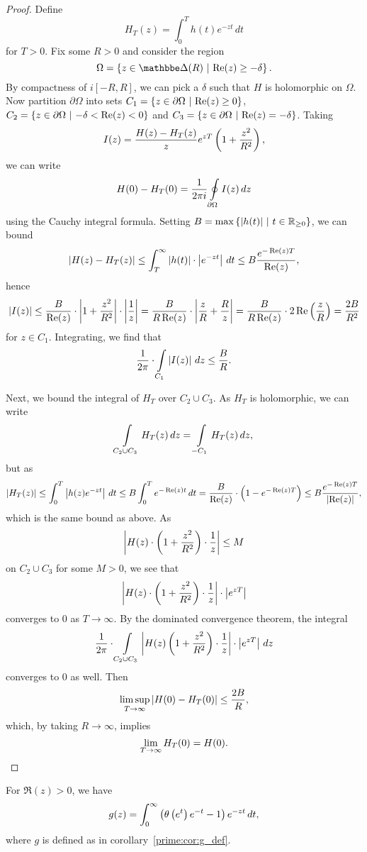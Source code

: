 \begin{proof}
Define
\[
H_T(z) = \int_0^T h(t) e^{-zt}\,dt
\]
for $T > 0$. Fix some $R > 0$ and consider the region
\[
\Omega = \setb{z \in \dsk(R)}{\Re(z) \geq -\delta}.
\]
By compactness of $i[-R, R]$, we can pick a $\delta$ such that
$H$ is holomorphic on $\Omega$. Now partition $\partial \Omega$
into sets $C_1 = \left\{z \in \partial \Omega~\middle\vert~\operatorname{Re}(z) \geq 0\right\}$,
$C_2 = \left\{z \in \partial \Omega~\middle\vert~-\delta < \operatorname{Re}(z) < 0\right\}$ and
$C_3 = \left\{z \in \partial \Omega~\middle\vert~\operatorname{Re}(z) = -\delta\right\}$. Taking
\[
I(z) = \frac{H(z) - H_T(z)}{z} e^{zT} \left(1 + \frac{z^2}{R^2}\right),
\]
we can write
\[
H(0) - H_T(0) =
\frac{1}{2 \pi i} \oint\limits_{\partial \Omega} I(z)\,dz
\]
using the Cauchy integral formula. Setting
$B = \max \left\{\left\lvert h(t)\right\rvert~\middle\vert~t \in \mathbb{R}_{\geq 0}\right\}$, we can bound
\[
\left\lvert H(z) - H_T(z)\right\rvert \leq
\int_T^\infty \left\lvert h(t)\right\rvert \cdot \left\lvert e^{-zt}\right\rvert\,dt \leq
B \frac{e^{- \operatorname{Re}(z) T}}{\operatorname{Re}(z)},
\]
hence
\[
\left\lvert I(z)\right\rvert \leq
\frac{B}{\operatorname{Re}(z)} \cdot \left\lvert 1 + \frac{z^2}{R^2}\right\rvert \cdot
\left\lvert \frac{1}{z}\right\rvert =
\frac{B}{R \operatorname{Re}(z)} \cdot \left\lvert \frac{z}{R} + \frac{R}{z}\right\rvert =
\frac{B}{R \operatorname{Re}(z)} \cdot 2 \operatorname{Re} \left(\frac{z}{R}\right) =
\frac{2B}{R^2}
\]
for $z \in C_1$. Integrating, we find that
\[
\frac{1}{2 \pi} \cdot \int\limits_{C_1} \left\lvert I(z)\right\rvert\,dz \leq
\frac{B}{R}.
\]

Next, we bound the integral of $H_T$ over $C_2 \cup C_3$. As
$H_T$ is holomorphic, we can write
\[
\int\limits_{C_2 \cup C_3} H_T(z)\,dz =
\int\limits_{-C_1} H_T(z)\,dz,
\]
but as
\[
\left\lvert H_T(z)\right\rvert \leq
\int_0^T \left\lvert h(z) e^{-zt}\right\rvert\,dt \leq
B \int_0^T e^{-\operatorname{Re}(z) t}\,dt =
\frac{B}{\operatorname{Re}(z)} \cdot \left(1 - e^{-\operatorname{Re}(z) T}\right) \leq
B \frac{e^{-\operatorname{Re}(z)T}}{\left\lvert \operatorname{Re}(z)\right\rvert},
\]
which is the same bound as above. 
As
\[
\left\lvert H(z) \cdot \left(1 + \frac{z^2}{R^2}\right) \cdot \frac{1}{z}\right\rvert \leq M
\]
on $C_2 \cup C_3$ for some $M > 0$, we see that
\[
\left\lvert H(z) \cdot \left(1 + \frac{z^2}{R^2}\right) \cdot \frac{1}{z}\right\rvert \cdot
\left\lvert e^{zT}\right\rvert
\]
converges to $0$ as $T \to \infty$. By the dominated convergence
theorem, the integral
\[
\frac{1}{2 \pi} \cdot \int\limits_{C_2 \cup C_3}
\left\lvert H(z) \left(1 + \frac{z^2}{R^2}\right) \cdot \frac{1}{z}\right\rvert \cdot
\left\lvert e^{zT}\right\rvert\,dz
\]
converges to $0$ as well. Then
\[
\limsup_{T \to \infty} \left\lvert H(0) - H_T(0)\right\rvert \leq \frac{2B}{R},
\]
which, by taking $R \to \infty$, implies
\[
\lim_{T \to \infty} H_T(0) = H(0). \qedhere
\]
\end{proof}

\begin{lema}
For $\Re(z) > 0$, we have
\[
g(z) = \int_0^\infty \left(\theta \left(e^t\right) e^{-t} - 1\right) e^{-zt}\,dt,
\]
where $g$ is defined as in corollary~\ref{prime:cor:g_def}.
\end{lema}

